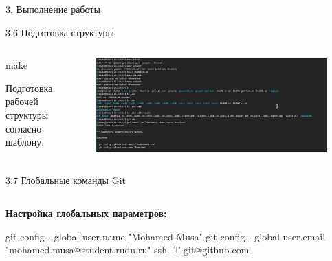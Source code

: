 \documentclass[
  ignorenonframetext,
  aspectratio=169,
]{beamer}
\newenvironment{Shaded}{\begin{snugshade}}{\end{snugshade}}
\newcommand{\AttributeTok}[1]{\textcolor[rgb]{0.40,0.45,0.13}{#1}}
\newcommand{\FunctionTok}[1]{\textcolor[rgb]{0.28,0.35,0.67}{#1}}
\newcommand{\NormalTok}[1]{\textcolor[rgb]{0.00,0.23,0.31}{#1}}
\newcommand{\StringTok}[1]{\textcolor[rgb]{0.13,0.47,0.30}{#1}}
\begin{document}
\begin{frame}[fragile]{3. Выполнение работы}
\begin{block}{3.6 Подготовка структуры}
\begin{columns}[c]
\begin{column}{0.6\textwidth}
\begin{Shaded}
\begin{Highlighting}[]
\FunctionTok{make}
\end{Highlighting}
\end{Shaded}

Подготовка рабочей структуры согласно шаблону.
\end{column}

\begin{column}{0.4\textwidth}
\includegraphics[width=0.9\textwidth,height=\textheight]{./image/make.png}
\end{column}
\end{columns}
\end{block}

\begin{block}{3.7 Глобальные команды Git}
\label{ux433ux43bux43eux431ux430ux43bux44cux43dux44bux435-ux43aux43eux43cux430ux43dux434ux44b-git}
\begin{columns}[c]
\begin{column}{0.6\textwidth}
\textbf{Настройка глобальных параметров:}

\begin{Shaded}
\begin{Highlighting}[]
\FunctionTok{git}\NormalTok{ config }\AttributeTok{{-}{-}global}\NormalTok{ user.name }\StringTok{"Mohamed Musa"}
\FunctionTok{git}\NormalTok{ config }\AttributeTok{{-}{-}global}\NormalTok{ user.email }\StringTok{"mohamed.musa@student.rudn.ru"}
\FunctionTok{ssh} \AttributeTok{{-}T}\NormalTok{ git@github.com}
\end{Highlighting}
\end{Shaded}
\end{column}


\end{columns}
\end{block}
\end{frame}
\end{document}
